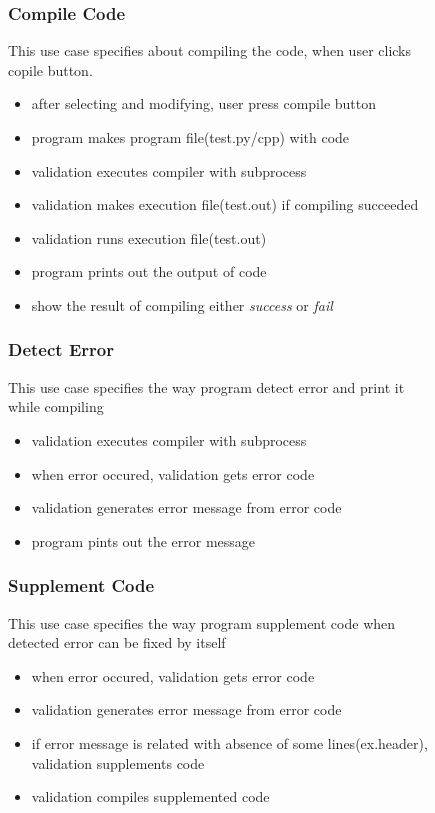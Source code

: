 \documentclass[conference]{IEEEtran}
\begin{document}
\begin{itemize}
\begin{itemize}
\begin{itemize}
\begin{itemize}
\begin{figure}[h]
\begin{enumerate}
\begin{itemize}
\begin{enumerate}
\subsubsection{Compile Code}
This use case specifies about compiling the code, when user clicks copile button.
\begin{itemize}
  \item after selecting and modifying, user press compile button
  \item program makes program file(test.py/cpp) with code
  \item validation executes compiler with subprocess
  \item validation makes execution file(test.out) if compiling succeeded
  \item validation runs execution file(test.out)
  \item program prints out the output of code
  \item show the result of compiling either \textit{success} or \textit{fail}
\end{itemize}
\textit{}



\subsubsection{Detect Error}
This use case specifies the way program detect error and print it while compiling

\begin{itemize}
  \item validation executes compiler with subprocess   
  \item when error occured, validation gets error code
  \item validation generates error message from error code
  \item program pints out the error message
\end{itemize}
\textit{}



\subsubsection{Supplement Code}
This use case specifies the way program supplement code when detected error can be fixed by itself
\begin{itemize}
  \item when error occured, validation gets error code
  \item validation generates error message from error code
  \item if error message is related with absence of some lines(ex.header), validation supplements code
  \item validation compiles supplemented code
\end{itemize}
\textit{}




\end{enumerate}
\end{itemize}
\end{enumerate}
\end{figure}
\end{itemize}
\end{itemize}
\end{itemize}
\end{itemize}
\end{document}
